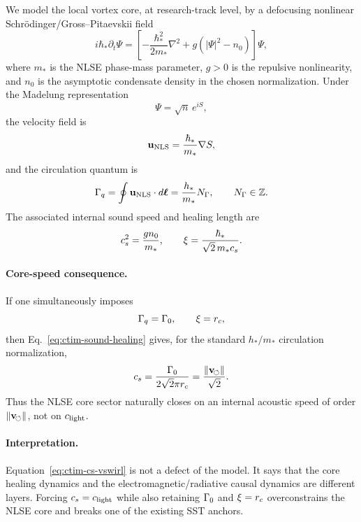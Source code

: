 We model the local vortex core, at research-track level, by a defocusing nonlinear Schrödinger/Gross--Pitaevskii field
\begin{equation}
    i\hbar_*\partial_t\Psi
    =
    \left[-\frac{\hbar_*^2}{2m_*}\nabla^2
    +g\left(|\Psi|^2-n_0\right)\right]\Psi,
    \label{eq:ctim-nlse}
\end{equation}
where \(m_*\) is the NLSE phase-mass parameter, \(g>0\) is the repulsive nonlinearity, and \(n_0\) is the asymptotic condensate density in the chosen normalization.  Under the Madelung representation
\begin{equation}
    \Psi=\sqrt{n}\,e^{iS},
\end{equation}
the velocity field is
\begin{equation}
    \mathbf u_{\mathrm{NLS}}=\frac{\hbar_*}{m_*}\nabla S,
    \label{eq:ctim-madelung-velocity}
\end{equation}
and the circulation quantum is
\begin{equation}
    \Gamma_q
    =
    \oint \mathbf u_{\mathrm{NLS}}\cdot d\boldsymbol\ell
    =
    \frac{h_*}{m_*}N_\Gamma,
    \qquad N_\Gamma\in\mathbb Z.
    \label{eq:ctim-circ-quantum}
\end{equation}
The associated internal sound speed and healing length are
\begin{equation}
    c_s^2=\frac{g n_0}{m_*},
    \qquad
    \xi=\frac{\hbar_*}{\sqrt{2}\,m_*c_s}.
    \label{eq:ctim-sound-healing}
\end{equation}

\paragraph{Core-speed consequence.}
If one simultaneously imposes
\begin{equation}
    \Gamma_q=\Gamma_0,
    \qquad
    \xi=r_c,
\end{equation}
then Eq.~\eqref{eq:ctim-sound-healing} gives, for the standard \(h_*/m_*\) circulation normalization,
\begin{equation}
    c_s
    =
    \frac{\Gamma_0}{2\sqrt{2}\pi r_c}
    =
    \frac{\lVert\mathbf{v}_{\!\boldsymbol{\circlearrowleft}}\rVert}{\sqrt{2}}.
    \label{eq:ctim-cs-vswirl}
\end{equation}
Thus the NLSE core sector naturally closes on an internal acoustic speed of order \(\lVert\mathbf{v}_{\!\boldsymbol{\circlearrowleft}}\rVert\), not on \(c_{\mathrm{light}}\).

\paragraph{Interpretation.}
Equation~\eqref{eq:ctim-cs-vswirl} is not a defect of the model.  It says that the core healing dynamics and the electromagnetic/radiative causal dynamics are different layers.  Forcing \(c_s=c_{\mathrm{light}}\) while also retaining \(\Gamma_0\) and \(\xi=r_c\) overconstrains the NLSE core and breaks one of the existing SST anchors.

